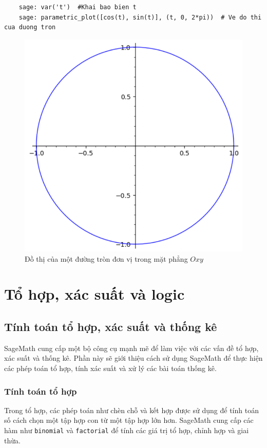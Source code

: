 \begin{lstlisting}
	sage: var('t')	#Khai bao bien t
	sage: parametric_plot([cos(t), sin(t)], (t, 0, 2*pi))  # Ve do thi cua duong tron
\end{lstlisting}
\begin{figure}
	\centering
	\includegraphics[width=0.7\linewidth]{images/screenshot012}
	\caption{Đồ thị của một đường tròn đơn vị trong mặt phẳng \( Oxy \)}
	\label{fig:screenshot012}
\end{figure}

\section{Tổ hợp, xác suất và logic}
\subsection{Tính toán tổ hợp, xác suất và thống kê}

SageMath cung cấp một bộ công cụ mạnh mẽ để làm việc với các vấn đề tổ hợp, xác suất và thống kê. Phần này sẽ giới thiệu cách sử dụng SageMath để thực hiện các phép toán tổ hợp, tính xác suất và xử lý các bài toán thống kê.

\subsubsection{Tính toán tổ hợp}

Trong tổ hợp, các phép toán như chèn chỗ và kết hợp được sử dụng để tính toán số cách chọn một tập hợp con từ một tập hợp lớn hơn. SageMath cung cấp các hàm như \texttt{binomial} và \texttt{factorial} để tính các giá trị tổ hợp, chỉnh hợp và giai thừa.

